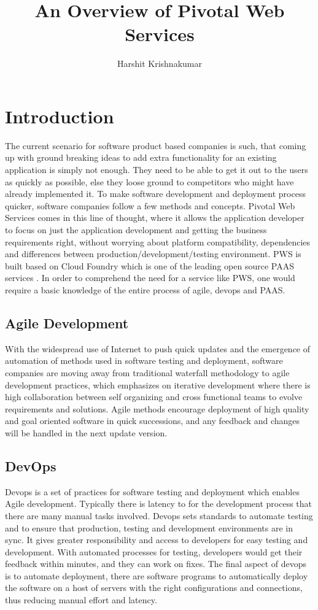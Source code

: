 \documentclass[9pt,twocolumn,twoside]{../../styles/osajnl}
\title{An Overview of Pivotal Web Services}
\author[1,*]{Harshit Krishnakumar}
\affil[1]{School of Informatics and Computing, Bloomington, IN 47408, U.S.A.}
\affil[*]{Corresponding authors: harkrish@iu.edu, S17-IR-2014}
\begin{document}
\maketitle

\section{Introduction}

The current scenario for software product based companies is such, that coming up with ground breaking ideas to add extra functionality for an existing application is simply not enough. They need to be able to get it out to the users as quickly as possible, else they loose ground to competitors who might have already implemented it. To make software development and deployment process quicker, software companies follow a few methods and concepts. Pivotal Web Services comes in this line of thought, where it allows the application developer to focus on just the application development and getting the business requirements right, without worrying about platform compatibility, dependencies and differences between production/development/testing environment. PWS is built based on Cloud Foundry which is one of the leading open source PAAS services \cite{www-pivotal}. In order to comprehend the need for a service like PWS, one would require a basic knowledge of the entire process of agile, devops and PAAS.
\subsection{Agile Development}
With the widespread use of Internet to push quick updates and the emergence of automation of methods used in software testing and deployment, software companies are moving away from traditional waterfall methodology to agile development practices, which emphasizes on iterative development where there is high collaboration between self organizing and cross functional teams to evolve requirements and solutions. Agile methods encourage deployment of high quality and goal oriented software in quick successions, and any feedback and changes will be handled in the next update version. 

\subsection{DevOps}
Devops is a set of practices for software testing and deployment which enables Agile development. Typically there is latency to for the development process that there are many manual tasks involved. Devops sets standards to automate testing and to ensure that production, testing and development environments are in sync. It gives greater responsibility and access to developers for easy testing and development. With automated processes for testing, developers would get their feedback within minutes, and they can work on fixes. The final aspect of devops is to automate deployment, there are software programs to automatically deploy the software on a host of servers with the right configurations and connections, thus reducing manual effort and latency. 
\end{document}

